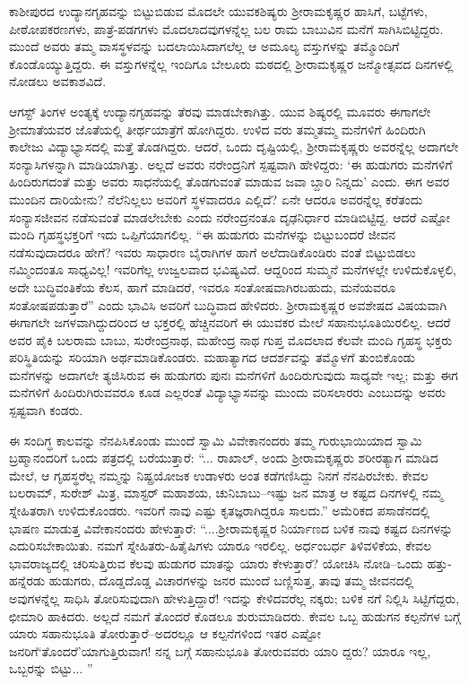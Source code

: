 ಕಾಶೀಪುರದ ಉದ್ಯಾನಗೃಹವನ್ನು ಬಿಟ್ಟುಬಿಡುವ ಮೊದಲೇ ಯುವಕಶಿಷ್ಯರು ಶ್ರೀರಾಮಕೃಷ್ಣರ ಹಾಸಿಗೆ, ಬಟ್ಟೆಗಳು, ಪೀಠೋಪಕರಣಗಳು, ಪಾತ್ರೆ-ಪಡಗಗಳು ಮೊದಲಾದವುಗಳನ್ನೆಲ್ಲ ಬಲ ರಾಮ ಬಾಬುವಿನ ಮನೆಗೆ ಸಾಗಿಸಿಬಿಟ್ಟಿದ್ದರು. ಮುಂದೆ ಅವರು ತಮ್ಮ ವಾಸಸ್ಥಳವನ್ನು ಬದಲಾಯಿಸಿದಾಗಲೆಲ್ಲ ಆ ಅಮೂಲ್ಯ ವಸ್ತುಗಳನ್ನು ತಮ್ಮೊಂದಿಗೆ ಕೊಂಡೊಯ್ಯುತ್ತಿದ್ದರು. ಈ ವಸ್ತುಗಳನ್ನೆಲ್ಲ ಇಂದಿಗೂ ಬೇಲೂರು ಮಠದಲ್ಲಿ ಶ್ರೀರಾಮಕೃಷ್ಣರ ಜನ್ಮೋತ್ಸವದ ದಿನಗಳಲ್ಲಿ ನೋಡಲು ಅವಕಾಶವಿದೆ.

ಆಗಸ್ಟ್ ತಿಂಗಳ ಅಂತ್ಯಕ್ಕೆ ಉದ್ಯಾನಗೃಹವನ್ನು ತೆರವು ಮಾಡಬೇಕಾಗಿತ್ತು. ಯುವ ಶಿಷ್ಯರಲ್ಲಿ ಮೂವರು ಈಗಾಗಲೇ ಶ್ರೀಮಾತೆಯವರ ಜೊತೆಯಲ್ಲಿ ತೀರ್ಥಯಾತ್ರೆಗೆ ಹೋಗಿದ್ದರು. ಉಳಿದ ವರು ತಮ್ಮತಮ್ಮ ಮನೆಗಳಿಗೆ ಹಿಂದಿರುಗಿ ಕಾಲೇಜು ವಿದ್ಯಾಭ್ಯಾಸದಲ್ಲಿ ಮತ್ತೆ ತೊಡಗಿದ್ದರು. ಆದರೆ, ಒಂದು ದೃಷ್ಟಿಯಲ್ಲಿ, ಶ್ರೀರಾಮಕೃಷ್ಣರು ಅವರನ್ನೆಲ್ಲ ಅದಾಗಲೇ ಸಂನ್ಯಾಸಿಗಳನ್ನಾಗಿ ಮಾಡಿಯಾಗಿತ್ತು. ಅಲ್ಲದೆ ಅವರು ನರೇಂದ್ರನಿಗೆ ಸ್ಪಷ್ಟವಾಗಿ ಹೇಳಿದ್ದರು: ‘ಈ ಹುಡುಗರು ಮನೆಗಳಿಗೆ ಹಿಂದಿರುಗದಂತೆ ಮತ್ತು ಅವರು ಸಾಧನೆಯಲ್ಲಿ ತೊಡಗುವಂತೆ ಮಾಡುವ ಜವಾ ಬ್ದಾರಿ ನಿನ್ನದು’ ಎಂದು. ಈಗ ಅವರ ಮುಂದಿನ ದಾರಿಯೇನು? ನೆಲೆನಿಲ್ಲಲು ಅವರಿಗೆ ಸ್ಥಳವಾದರೂ ಎಲ್ಲಿದೆ? ಏನೇ ಆದರೂ ಅವರನ್ನೆಲ್ಲ ಕರೆತಂದು ಸಂನ್ಯಾಸಜೀವನ ನಡೆಸುವಂತೆ ಮಾಡಲೇಬೇಕು ಎಂದು ನರೇಂದ್ರನಂತೂ ದೃಢನಿರ್ಧಾರ ಮಾಡಿಬಿಟ್ಟಿದ್ದ. ಆದರೆ ಎಷ್ಟೋ ಮಂದಿ ಗೃಹಸ್ಥಭಕ್ತರಿಗೆ ಇದು ಒಪ್ಪಿಗೆಯಾಗಲಿಲ್ಲ. “ಈ ಹುಡುಗರು ಮನೆಗಳನ್ನು ಬಿಟ್ಟುಬಂದರೆ ಜೀವನ ನಡೆಸುವುದಾದರೂ ಹೇಗೆ? ಇವರು ಸಾಧಾರಣ ಬೈರಾಗಿಗಳ ಹಾಗೆ ಅಲೆದಾಡಿಕೊಂಡಿರು ವಂತೆ ಬಿಟ್ಟುಬಿಡಲು ನಮ್ಮಿಂದಂತೂ ಸಾಧ್ಯವಿಲ್ಲ! ಇವರಿಗೆಲ್ಲ ಉಜ್ವಲವಾದ ಭವಿಷ್ಯವಿದೆ. ಆದ್ದರಿಂದ ಸುಮ್ಮನೆ ಮನೆಗಳಲ್ಲೇ ಉಳಿದುಕೊಳ್ಳಲಿ, ಅದೇ ಬುದ್ಧಿವಂತಿಕೆಯ ಕೆಲಸ, ಹಾಗೆ ಮಾಡಿದರೆ, ಇವರೂ ಸಂತೋಷವಾಗಿರಬಹುದು, ಮನೆಯವರೂ ಸಂತೋಷಪಡುತ್ತಾರೆ” ಎಂದು ಭಾವಿಸಿ ಅವರಿಗೆ ಬುದ್ಧಿವಾದ ಹೇಳಿದರು. ಶ್ರೀರಾಮಕೃಷ್ಣರ ಅವಶೇಷದ ವಿಷಯವಾಗಿ ಈಗಾಗಲೇ ಜಗಳವಾಗಿದ್ದುದರಿಂದ ಆ ಭಕ್ತರಲ್ಲಿ ಹೆಚ್ಚಿನವರಿಗೆ ಈ ಯುವಕರ ಮೇಲೆ ಸಹಾನುಭೂತಿಯಿರಲಿಲ್ಲ. ಆದರೆ ಅವರ ಪೈಕಿ ಬಲರಾಮ ಬಾಬು, ಸುರೇಂದ್ರನಾಥ, ಮಹೇಂದ್ರ ನಾಥ ಗುಪ್ತ ಮೊದಲಾದ ಕೆಲವೇ ಮಂದಿ ಗೃಹಸ್ಥ ಭಕ್ತರು ಪರಿಸ್ಥಿತಿಯನ್ನು ಸರಿಯಾಗಿ ಅರ್ಥಮಾಡಿಕೊಂಡರು. ಮಹಾತ್ಯಾಗದ ಆದರ್ಶವನ್ನು ತಮ್ಮೊಳಗೆ ತುಂಬಿಕೊಂಡು ಮನೆಗಳನ್ನು ಅದಾಗಲೇ ತ್ಯಜಿಸಿರುವ ಈ ಹುಡುಗರು ಪುನಃ ಮನೆಗಳಿಗೆ ಹಿಂದಿರುಗುವುದು ಸಾಧ್ಯವೇ ಇಲ್ಲ; ಮತ್ತು ಈಗ ಮನೆಗಳಿಗೆ ಹಿಂದಿರುಗಿರುವವರೂ ಕೂಡ ಎಲ್ಲರಂತೆ ವಿದ್ಯಾಭ್ಯಾಸವನ್ನು ಮುಂದು ವರಿಸಲಾರರು ಎಂಬುದನ್ನು ಅವರು ಸ್ಪಷ್ಟವಾಗಿ ಕಂಡರು.

ಈ ಸಂದಿಗ್ಧ ಕಾಲವನ್ನು ನೆನಪಿಸಿಕೊಂಡು ಮುಂದೆ ಸ್ವಾಮಿ ವಿವೇಕಾನಂದರು ತಮ್ಮ ಗುರುಭಾಯಿಯಾದ ಸ್ವಾಮಿ ಬ್ರಹ್ಮಾನಂದರಿಗೆ ಒಂದು ಪತ್ರದಲ್ಲಿ ಬರೆಯುತ್ತಾರೆ: “... ರಾಖಾಲ್, ಅಂದು ಶ್ರೀರಾಮಕೃಷ್ಣರು ಶರೀರತ್ಯಾಗ ಮಾಡಿದ ಮೇಲೆ, ಆ ಗೃಹಸ್ಥರೆಲ್ಲ ನಮ್ಮನ್ನು ನಿಷ್ಪ್ರಯೋಜಕ ಉಡಾಳರು ಅಂತ ಕಡೆಗಣಿಸಿದ್ದು ನಿನಗೆ ನೆನಪಿರಬೇಕು. ಕೇವಲ ಬಲರಾಮ್, ಸುರೇಶ್ ಮಿತ್ರ, ಮಾಸ್ಟರ್ ಮಹಾಶಯ, ಚುನಿಬಾಬು–ಇಷ್ಟು ಜನ ಮಾತ್ರ ಆ ಕಷ್ಟದ ದಿನಗಳಲ್ಲಿ ನಮ್ಮ ಸ್ನೇಹಿತರಾಗಿ ಉಳಿದುಕೊಂಡರು. ಇವರಿಗೆ ನಾವು ಎಷ್ಟು ಕೃತಜ್ಞರಾಗಿದ್ದರೂ ಸಾಲದು.” ಅಮೆರಿಕದ ಪಸಾಡೆನದಲ್ಲಿ ಭಾಷಣ ಮಾಡುತ್ತ ವಿವೇಕಾನಂದರು ಹೇಳುತ್ತಾರೆ: “....ಶ್ರೀರಾಮಕೃಷ್ಣರ ನಿರ್ಯಾಣದ ಬಳಿಕ ನಾವು ಕಷ್ಟದ ದಿನಗಳನ್ನು ಎದುರಿಸಬೇಕಾಯಿತು. ನಮಗೆ ಸ್ನೇಹಿತರು-ಹಿತೈಷಿಗಳು ಯಾರೂ ಇರಲಿಲ್ಲ. ಅರ್ಧಂಬರ್ಧ ತಿಳಿವಳಿಕೆಯ, ಕೇವಲ ಭಾವರಾಜ್ಯದಲ್ಲಿ ಚರಿಸುತ್ತಿರುವ ಕೆಲವು ಹುಡುಗರ ಮಾತನ್ನು ಯಾರು ಕೇಳುತ್ತಾರೆ? ಯೋಚಿಸಿ ನೋಡಿ–ಒಂದು ಹತ್ತು-ಹನ್ನೆರಡು ಹುಡುಗರು, ದೊಡ್ಡದೊಡ್ಡ ವಿಚಾರಗಳನ್ನು ಜನರ ಮುಂದೆ ಬಣ್ಣಿಸುತ್ತ, ತಾವು ತಮ್ಮ ಜೀವನದಲ್ಲಿ ಅವುಗಳನ್ನೆಲ್ಲ ಸಾಧಿಸಿ ತೋರಿಸುವುದಾಗಿ ಹೇಳುತ್ತಿದ್ದಾರೆ! ಇದನ್ನು ಕೇಳಿದವರೆಲ್ಲ ನಕ್ಕರು; ಬಳಿಕ ನಗೆ ನಿಲ್ಲಿಸಿ ಸಿಟ್ಟಿಗೆದ್ದರು, ಛೀಮಾರಿ ಹಾಕಿದರು. ಅಲ್ಲದೆ ನಮಗೆ ತೊಂದರೆ ಕೊಡಲೂ ಶುರುಮಾಡಿದರು. ಕೇವಲ ಒಬ್ಬ ಹುಡುಗನ ಕಲ್ಪನೆಗಳ ಬಗ್ಗೆ ಯಾರು ಸಹಾನುಭೂತಿ ತೋರುತ್ತಾರೆ–ಅದರಲ್ಲೂ ಆ ಕಲ್ಪನೆಗಳಿಂದ ಇತರ ಎಷ್ಟೋ ಜನರಿಗೆ‘ತೊಂದರೆ’ಯಾಗುತ್ತಿರುವಾಗ! ನನ್ನ ಬಗ್ಗೆ ಸಹಾನುಭೂತಿ ತೋರುವವರು ಯಾರಿ ದ್ದರು? ಯಾರೂ ಇಲ್ಲ, ಒಬ್ಬರನ್ನು ಬಿಟ್ಟು... ”

